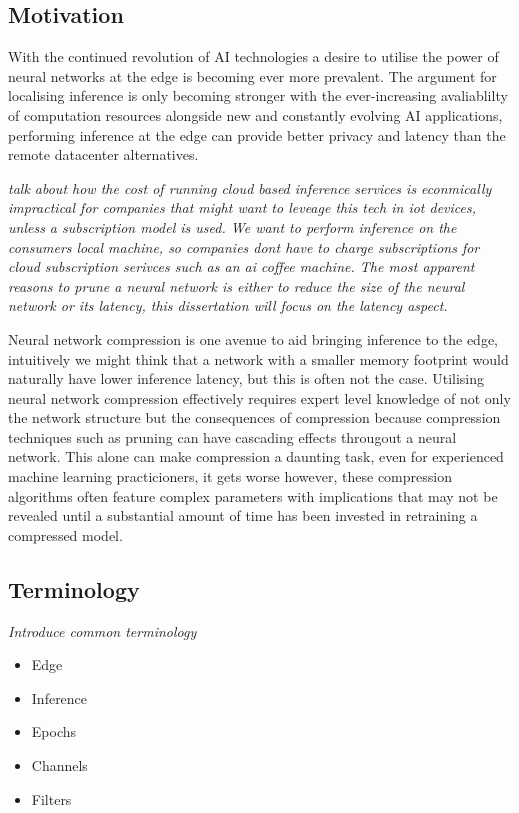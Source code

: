 \documentclass[../Dissertation.tex]{subfiles}
\begin{document}
\subsection{Motivation}
With the continued revolution of AI technologies a desire to utilise the power of neural networks at the edge is becoming ever more prevalent.
The argument for localising inference is only becoming stronger with the ever-increasing avaliablilty of computation resources alongside new and constantly evolving AI applications, performing inference at the edge can provide better privacy and latency than the remote datacenter alternatives.

\emph{talk about how the cost of running cloud based inference services is econmically impractical for companies that might want to leveage this tech in iot devices, unless a subscription model is used. We want to perform inference on the consumers local machine, so companies dont have to charge subscriptions for cloud subscription serivces such as an ai coffee machine. The most apparent reasons to prune a neural network is either to reduce the size of the neural network or its latency, this dissertation will focus on the latency aspect.}


Neural network compression is one avenue to aid bringing inference to the edge, intuitively we might think that a network with a smaller memory footprint would naturally have lower inference latency, but this is often not the case.
Utilising neural network compression effectively requires expert level knowledge of not only the network structure but the consequences of compression because compression techniques such as pruning can have cascading effects througout a neural network.
This alone can make compression a daunting task, even for experienced machine learning practicioners, it gets worse however, these compression algorithms often feature complex parameters with implications that may not be revealed until a substantial amount of time has been invested in retraining a compressed model.

\subsection{Terminology}
\emph{Introduce common terminology}


\begin{itemize}
    \item Edge
    \item Inference
    \item Epochs
    \item Channels
    \item Filters
\end{itemize}
\end{document}

